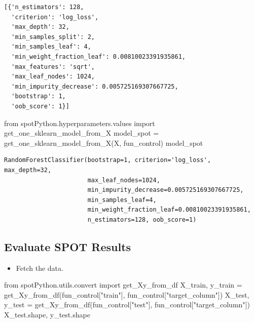\documentclass[
  letterpaper,
  DIV=11,
  numbers=noendperiod]{scrreprt}
\newenvironment{Shaded}{\begin{snugshade}}{\end{snugshade}}
\newcommand{\ImportTok}[1]{\textcolor[rgb]{0.00,0.46,0.62}{#1}}
\newcommand{\NormalTok}[1]{\textcolor[rgb]{0.00,0.23,0.31}{#1}}
\newcommand{\OperatorTok}[1]{\textcolor[rgb]{0.37,0.37,0.37}{#1}}
\newcommand{\StringTok}[1]{\textcolor[rgb]{0.13,0.47,0.30}{#1}}
\providecommand{\tightlist}{%
  \setlength{\itemsep}{0pt}\setlength{\parskip}{0pt}}\usepackage{longtable,booktabs,array}
\begin{document}
\begin{verbatim}
[{'n_estimators': 128,
  'criterion': 'log_loss',
  'max_depth': 32,
  'min_samples_split': 2,
  'min_samples_leaf': 4,
  'min_weight_fraction_leaf': 0.00810023391935861,
  'max_features': 'sqrt',
  'max_leaf_nodes': 1024,
  'min_impurity_decrease': 0.005725169307667725,
  'bootstrap': 1,
  'oob_score': 1}]
\end{verbatim}

\begin{Shaded}
\begin{Highlighting}[]
\ImportTok{from}\NormalTok{ spotPython.hyperparameters.values }\ImportTok{import}\NormalTok{ get\_one\_sklearn\_model\_from\_X}
\NormalTok{model\_spot }\OperatorTok{=}\NormalTok{ get\_one\_sklearn\_model\_from\_X(X, fun\_control)}
\NormalTok{model\_spot}
\end{Highlighting}
\end{Shaded}

\begin{verbatim}
RandomForestClassifier(bootstrap=1, criterion='log_loss', max_depth=32,
                       max_leaf_nodes=1024,
                       min_impurity_decrease=0.005725169307667725,
                       min_samples_leaf=4,
                       min_weight_fraction_leaf=0.00810023391935861,
                       n_estimators=128, oob_score=1)
\end{verbatim}

\hypertarget{evaluate-spot-results}{%
\subsection{Evaluate SPOT Results}\label{evaluate-spot-results}}

\begin{itemize}
\tightlist
\item
  Fetch the data.
\end{itemize}

\begin{Shaded}
\begin{Highlighting}[]
\ImportTok{from}\NormalTok{ spotPython.utils.convert }\ImportTok{import}\NormalTok{ get\_Xy\_from\_df}
\NormalTok{X\_train, y\_train }\OperatorTok{=}\NormalTok{ get\_Xy\_from\_df(fun\_control[}\StringTok{"train"}\NormalTok{], fun\_control[}\StringTok{"target\_column"}\NormalTok{])}
\NormalTok{X\_test, y\_test }\OperatorTok{=}\NormalTok{ get\_Xy\_from\_df(fun\_control[}\StringTok{"test"}\NormalTok{], fun\_control[}\StringTok{"target\_column"}\NormalTok{])}
\NormalTok{X\_test.shape, y\_test.shape}
\end{Highlighting}
\end{Shaded}
\end{document}
